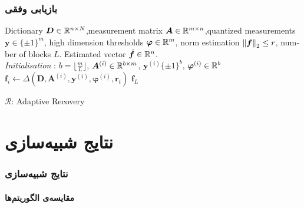 \begin{frame}
\frametitle{بازیابی وفقی}
\begin{latin}
\begin{algorithm}[H]
\begin{algorithmic}[1]
\REQUIRE Dictionary $ \bm{D}\in\mathbb{R}^{n\times N} $,measurement matrix $ \bm{A}\in\mathbb{R}^{m\times n} $,quantized measurements $ \bm{y} \in \lbrace\pm 1\rbrace^{m} $, high dimension thresholds $ \bm{\varphi}\in\mathbb{R}^{m} $, norm estimation $ \left\lVert\bm{f}\right\rVert_{2}\leq r $, number of blocks $ L $.
\ENSURE  Estimated vector $ \hat{\bm{f}}\in \mathbb{R}^{n} $.
\\ \textit{Initialisation} :  $ b = \lfloor\frac{m}{L}\rfloor $, $ \bm{A}^{(i)}\in \mathbb{R}^{b\times m}$, $ \bm{y}^{\left(i\right)} \lbrace\pm 1\rbrace^{b}$, $\bm{\varphi}^{\left(i\right)}\in \mathbb{R}^{b} $
\STATE $ \bm{f}_{i}\leftarrow \varDelta\left(\bm{D},\bm{A}^{(i)},\bm{y}^{\left(i\right)},\bm{\varphi}^{\left(i\right)},\bm{r}_{t}\right) $
\ENDFOR
\RETURN $ \bm{f}_{L} $
\end{algorithmic} 
\caption{$ \mathcal{R} $: Adaptive Recovery}
\label{alg:AR}
\end{algorithm}
\end{latin}
\end{frame}


\section{نتایج شبیه‌سازی\hfill}

\begin{frame}
\frametitle{نتایج شبیه‌سازی}
\framesubtitle{مقایسه‌ی الگوریتم‌ها}
\end{frame}

